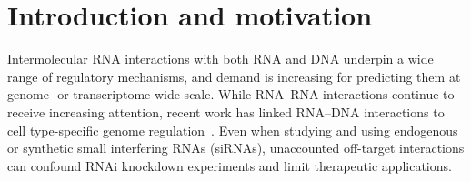 \documentclass[unnumsec,webpdf,contemporary,large]{oup-authoring-template}
\begin{document}

\maketitle

\section{Introduction and motivation}

Intermolecular RNA interactions with both RNA and DNA underpin a wide range of regulatory mechanisms, and demand is increasing for predicting them at genome- or transcriptome-wide scale.
While RNA--RNA interactions continue to receive increasing attention, recent work has linked RNA--DNA interactions to cell type-specific genome regulation~\citep{Lambolez2026RNA}.
Even when studying and using endogenous or synthetic small interfering RNAs (siRNAs), unaccounted off-target interactions can confound RNAi knockdown experiments and limit therapeutic applications.
\end{document}

